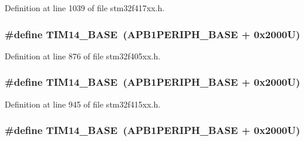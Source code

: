 Definition at line 1039 of file stm32f417xx.\+h.

\subsubsection[{\texorpdfstring{T\+I\+M14\+\_\+\+B\+A\+SE}{TIM14_BASE}}]{\setlength{\rightskip}{0pt plus 5cm}\#define T\+I\+M14\+\_\+\+B\+A\+SE~({\bf A\+P\+B1\+P\+E\+R\+I\+P\+H\+\_\+\+B\+A\+SE} + 0x2000\+U)}\hypertarget{group___peripheral__registers__structures_ga862855347d6e1d92730dfe17ee8e90b8}{}\label{group___peripheral__registers__structures_ga862855347d6e1d92730dfe17ee8e90b8}


Definition at line 876 of file stm32f405xx.\+h.

\subsubsection[{\texorpdfstring{T\+I\+M14\+\_\+\+B\+A\+SE}{TIM14_BASE}}]{\setlength{\rightskip}{0pt plus 5cm}\#define T\+I\+M14\+\_\+\+B\+A\+SE~({\bf A\+P\+B1\+P\+E\+R\+I\+P\+H\+\_\+\+B\+A\+SE} + 0x2000\+U)}\hypertarget{group___peripheral__registers__structures_ga862855347d6e1d92730dfe17ee8e90b8}{}\label{group___peripheral__registers__structures_ga862855347d6e1d92730dfe17ee8e90b8}


Definition at line 945 of file stm32f415xx.\+h.

\subsubsection[{\texorpdfstring{T\+I\+M14\+\_\+\+B\+A\+SE}{TIM14_BASE}}]{\setlength{\rightskip}{0pt plus 5cm}\#define T\+I\+M14\+\_\+\+B\+A\+SE~({\bf A\+P\+B1\+P\+E\+R\+I\+P\+H\+\_\+\+B\+A\+SE} + 0x2000\+U)}\hypertarget{group___peripheral__registers__structures_ga862855347d6e1d92730dfe17ee8e90b8}{}\label{group___peripheral__registers__structures_ga862855347d6e1d92730dfe17ee8e90b8}



